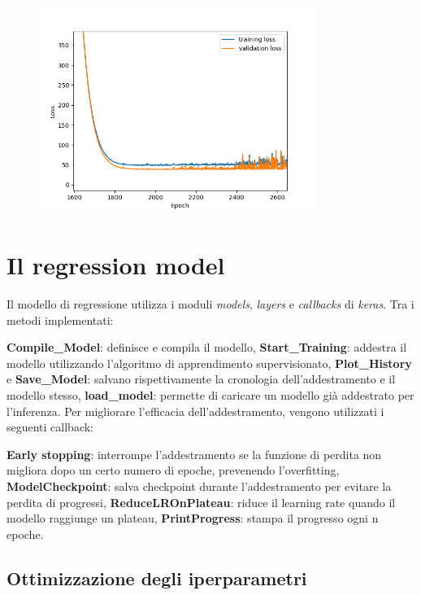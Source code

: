 \documentclass[10pt]{article}
\begin{document}
\begin{figure}
	\includegraphics[width=0.8\textwidth]{History_subplot_3.png}
	\label{historyNonNormalised2}
\end{figure}

\section{Il regression model}

Il modello di regressione utilizza i moduli \textit{models}, \textit{layers} e \textit{callbacks} di \textit{keras}. Tra i metodi implementati:

\textbf{Compile\_Model}: definisce e compila il modello,
\textbf{Start\_Training}: addestra il modello utilizzando l'algoritmo di apprendimento supervisionato,
\textbf{Plot\_History} e \textbf{Save\_Model}: salvano rispettivamente la cronologia dell'addestramento e il modello stesso,
\textbf{load\_model}: permette di caricare un modello già addestrato per l'inferenza.
Per migliorare l'efficacia dell'addestramento, vengono utilizzati i seguenti callback:

\textbf{Early stopping}: interrompe l'addestramento se la funzione di perdita non migliora dopo un certo numero di epoche, prevenendo l'overfitting,
\textbf{ModelCheckpoint}: salva checkpoint durante l'addestramento per evitare la perdita di progressi,
\textbf{ReduceLROnPlateau}: riduce il learning rate quando il modello raggiunge un plateau,
\textbf{PrintProgress}: stampa il progresso ogni n epoche.
\subsection{Ottimizzazione degli iperparametri}
\end{document}
